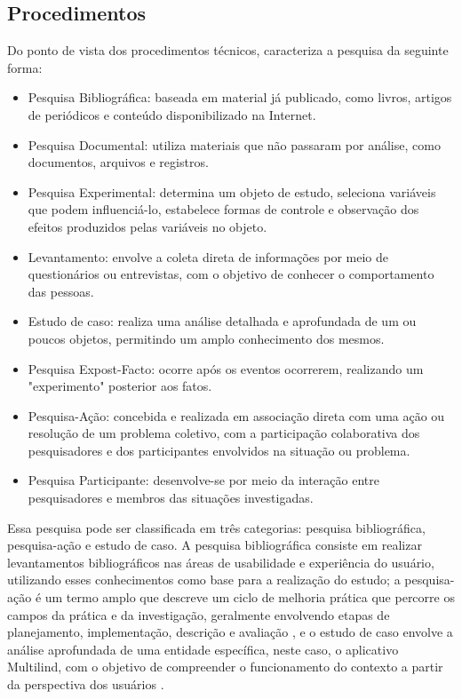 \subsection{Procedimentos}
\label{sec:Procedimentos}
Do ponto de vista dos procedimentos técnicos,  caracteriza a pesquisa da seguinte forma:

\begin{itemize}
	\item Pesquisa Bibliográfica: baseada em material já publicado, como livros, artigos de periódicos e conteúdo disponibilizado na Internet.
	\item Pesquisa Documental: utiliza materiais que não passaram por análise, como documentos, arquivos e registros.
	\item Pesquisa Experimental: determina um objeto de estudo, seleciona variáveis que podem influenciá-lo, estabelece formas de controle e observação dos efeitos produzidos pelas variáveis no objeto.
	\item Levantamento: envolve a coleta direta de informações por meio de questionários ou entrevistas, com o objetivo de conhecer o comportamento das pessoas.
	\item Estudo de caso: realiza uma análise detalhada e aprofundada de um ou poucos objetos, permitindo um amplo conhecimento dos mesmos.
	\item Pesquisa Expost-Facto: ocorre após os eventos ocorrerem, realizando um "experimento" posterior aos fatos.
	\item Pesquisa-Ação: concebida e realizada em associação direta com uma ação ou resolução de um problema coletivo, com a participação colaborativa dos pesquisadores e dos participantes envolvidos na situação ou problema.
	\item Pesquisa Participante: desenvolve-se por meio da interação entre pesquisadores e membros das situações investigadas.
\end{itemize}

Essa pesquisa pode ser classificada em três categorias: pesquisa bibliográfica, pesquisa-ação e estudo de caso. A pesquisa bibliográfica consiste em realizar levantamentos bibliográficos nas áreas de usabilidade e experiência do usuário, 
utilizando esses conhecimentos como base para a realização do estudo; a pesquisa-ação é um termo amplo que descreve um ciclo de melhoria prática que percorre os campos da prática e da investigação, geralmente envolvendo etapas de planejamento, 
implementação, descrição e avaliação \cite{tripp2005}, e o estudo de caso envolve a análise aprofundada de uma entidade específica, neste caso, o aplicativo Multilind, com o objetivo de compreender o funcionamento do contexto a partir da perspectiva 
dos usuários \cite{gerhardt2009}.

